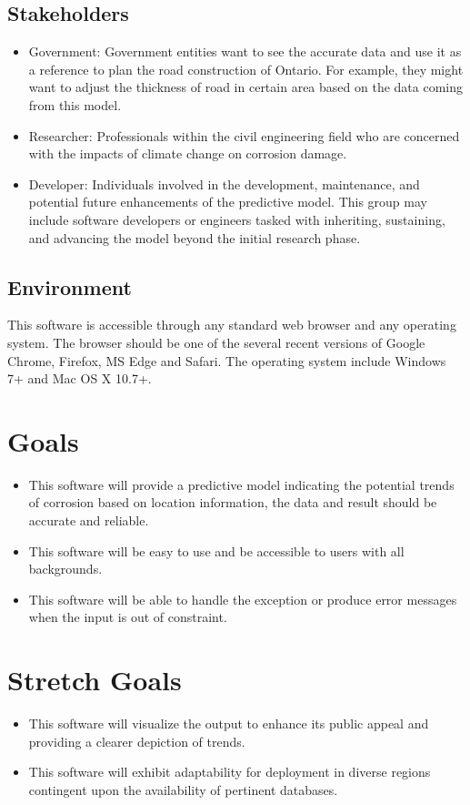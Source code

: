 \documentclass{article}
\begin{document}
\subsection{Stakeholders}
\begin{itemize}
\item Government: Government entities want to see the accurate data and use it as a reference to plan the road construction of Ontario. For example, they might want to adjust the thickness of road in certain area based on the data coming from this model.
\item Researcher: Professionals within the civil engineering field who are concerned with the impacts of climate change on corrosion damage. 
\item Developer: Individuals involved in the development, maintenance, and potential future enhancements of the predictive model. This group may include software developers or engineers tasked with inheriting, sustaining, and advancing the model beyond the initial research phase.
\end{itemize}


\subsection{Environment}
This software is accessible through any standard web browser and any operating system. The browser should be one of the several recent versions of Google Chrome, Firefox, MS Edge and Safari. The operating system include Windows 7+ and Mac OS X 10.7+.

\section{Goals}
\begin{itemize}
\item This software will provide a predictive model indicating the potential trends of corrosion based on location information, the data and result should be accurate and reliable.
\item This software will be easy to use and be accessible to users with all backgrounds. 
\item This software will be able to handle the exception or produce error messages when the input is out of constraint.
\end{itemize}

\section{Stretch Goals}
\begin{itemize}
\item This software will visualize the output to enhance its public appeal and providing a clearer depiction of trends.
\item This software will exhibit adaptability for deployment in diverse regions contingent upon the availability of pertinent databases.
\end{itemize}
\end{document}
